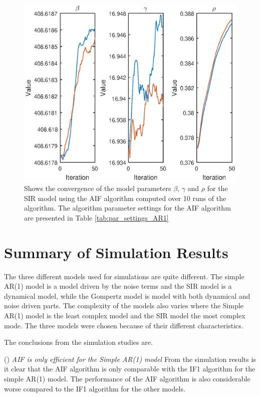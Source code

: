 \documentclass[twoside,openright]{report}
\begin{document}
\begin{figure}[h]
  \centering
    \includegraphics[width=1\textwidth]{./fig_sir/AIF}
  \caption{Shows the convergence of the model parameters $\beta$, $\gamma$ and $\rho$ for the SIR model using the AIF algorithm computed over 10 runs of the algorithm. The algorithm parameter settings for the AIF algorithm are presented in Table \ref{tab:par_settings_AR1} }
  \label{fig:res_AIF}
\end{figure}


\section{Summary of Simulation Results}
The three different models used for simulations are quite different. The simple AR(1) model is a model driven by the noise terms and the SIR model is a dynamical model, while the Gompertz model is model with both dynamical and noise driven parts. The complexity of the models also varies where the Simple AR(1) model is the least complex model and the SIR model the most complex mode. The three models  were  chosen because of their different characteristics. 

The conclusions from the simulation studies  are.   

\newcommand\mypara{\par(\thepara)\space}


\mypara \textit{ AIF is only efficient for the Simple AR(1) model } From the simulation results is it clear that the AIF algorithm is only comparable with the IF1 algorithm for the simple AR(1) model.  The performance of the AIF algorithm is also considerable worse compared to the IF1 algorithm for the other models.
\end{document}

